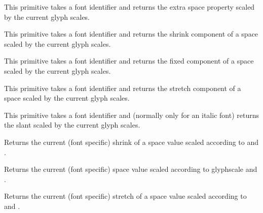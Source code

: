 \startnewprimitive[title={\prm {scaledfontextraspace}}]

This primitive takes a font identifier and returns the extra space
property scaled by the current glyph scales.

\stopnewprimitive

\startnewprimitive[title={\prm {scaledfontinterwordshrink}}]

This primitive takes a font identifier and returns the shrink
component of a space scaled by the current glyph scales.

\stopnewprimitive

\startnewprimitive[title={\prm {scaledfontinterwordspace}}]

This primitive takes a font identifier and returns the fixed
component of a space scaled by the current glyph scales.

\stopnewprimitive

\startnewprimitive[title={\prm {scaledfontinterwordstretch}}]

This primitive takes a font identifier and returns the stretch
component of a space scaled by the current glyph scales.

\stopnewprimitive

\startnewprimitive[title={\prm {scaledfontslantperpoint}}]

This primitive takes a font identifier and (normally only for an italic font)
returns the slant scaled by the current glyph scales.

\stopnewprimitive

\startnewprimitive[title={\prm {scaledinterwordshrink}}]

Returns the current (font specific) shrink of a space value scaled according to
 and .

\stopnewprimitive

\startnewprimitive[title={\prm {scaledinterwordspace}}]

Returns the current (font specific) space value scaled according to \prm
{glyphscale} and .

\stopnewprimitive

\startnewprimitive[title={\prm {scaledinterwordstretch}}]

Returns the current (font specific) stretch of a space value scaled according to
 and .

\stopnewprimitive

\startnewprimitive[title={\prm {scaledmathaxis}}]

